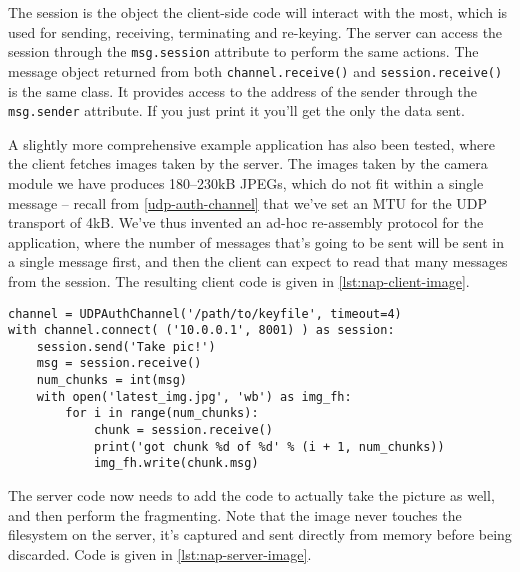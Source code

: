 The session is the object the client-side code will interact with the most, which is used for sending, receiving, terminating and re-keying. The server can access the session through the \texttt{msg.session} attribute to perform the same actions. The message object returned from both \texttt{channel.receive()} and \texttt{session.receive()} is the same class. It provides access to the address of the sender through the \texttt{msg.sender} attribute. If you just print it you'll get the only the data sent.

A slightly more comprehensive example application has also been tested, where the client fetches images taken by the server. The images taken by the camera module we have produces 180--230kB JPEGs, which do not fit within a single message -- recall from \autoref{udp-auth-channel} that we've set an MTU for the UDP transport of 4kB. We've thus invented an ad-hoc re-assembly protocol for the application, where the number of messages that's going to be sent will be sent in a single message first, and then the client can expect to read that many messages from the session. The resulting client code is given in \autoref{lst:nap-client-image}.

\begin{lstlisting}[caption=Client Re-assembling Image Data, label=lst:nap-client-image]
channel = UDPAuthChannel('/path/to/keyfile', timeout=4)
with channel.connect( ('10.0.0.1', 8001) ) as session:
    session.send('Take pic!')
    msg = session.receive()
    num_chunks = int(msg)
    with open('latest_img.jpg', 'wb') as img_fh:
        for i in range(num_chunks):
            chunk = session.receive()
            print('got chunk %d of %d' % (i + 1, num_chunks))
            img_fh.write(chunk.msg)
\end{lstlisting}

The server code now needs to add the code to actually take the picture as well, and then perform the fragmenting. Note that the image never touches the filesystem on the server, it's captured and sent directly from memory before being discarded. Code is given in \autoref{lst:nap-server-image}.

\clearpage

